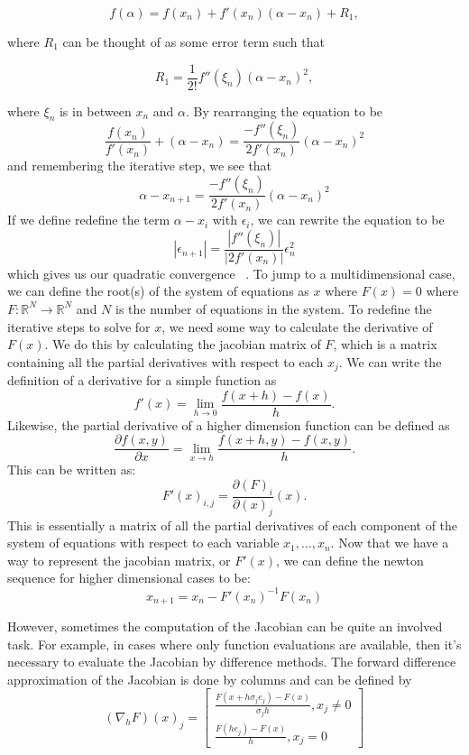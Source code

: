 \documentclass[paper=a4, fontsize=11pt]{scrartcl} %
\numberwithin{equation}{section} %
\numberwithin{figure}{section} %
\numberwithin{table}{section} %
\begin{document}
$$ f(\alpha) = f(x_n) + f'(x_n)(\alpha - x_n) + R_1, $$

where $R_1$ can be thought of as some error term such that 

$$ R_1 = \frac{1}{2!}f''(\xi_n)(\alpha - x_n)^2, $$

where $\xi_n$ is in between $x_n$ and $\alpha$.  
By rearranging the equation to be
$$ \frac{f(x_n)}{f'(x_n)} + (\alpha - x_n) = \frac{-f''(\xi_n)}{2f'(x_n)}(\alpha - x_n)^2 $$
and remembering the iterative step, we see that 
$$ \alpha - x_{n+1} = \frac{-f''(\xi_n)}{2f'(x_n)}(\alpha - x_n)^2$$
If we define redefine the term $\alpha - x_i$ with $\epsilon_i$, we can rewrite the equation to be
$$ |\epsilon_{n+1}| = \frac{|f''(\xi_n)|}{|2f'(x_n)|}\epsilon_n^2 $$
which gives us our quadratic convergence ~\cite{newton_kelley}.  
\bigskip
To jump to a multidimensional case, we can define the root(s) of the system of equations as $x$ where $F(x) = 0$ where $F:\mathbb{R}^N \rightarrow \mathbb{R}^N$ and $N$ is the number of equations in the system.  To redefine the iterative steps to solve for $x$, we need some way to calculate the derivative of $F(x)$.  We do this by calculating the jacobian matrix of $F$, which is a matrix containing all the partial derivatives with respect to each $x_j$.  We can write the definition of a derivative for a simple function as $$f'(x) = \lim_{h \to 0} \frac{f(x+h) - f(x)}{h}.$$  Likewise, the partial derivative of a higher dimension function can be defined as $$\frac{\partial f(x,y)}{\partial x} = \lim_{x \to h} \frac{f(x+h,y) - f(x,y)}{h}.$$
This can be written as:
$$ F'(x)_{i,j} = \frac{\partial(F)_i}{\partial(x)_j} (x). $$
This is essentially a matrix of all the partial derivatives of each component of the system of equations with respect to each variable $x_1 ,\hdots,x_n$.  Now that we have a way to represent the jacobian matrix, or $F'(x)$, we can define the newton sequence for higher dimensional cases to be:
$$ x_{n+1} = x_n - F'(x_n)^{-1} F(x_n) $$

However, sometimes the computation of the Jacobian can be quite an involved task.  For example, in cases where only function evaluations are available, then it's necessary to evaluate the Jacobian by difference methods.  The forward difference approximation of the Jacobian is done by columns and can be defined by 
$$
(\nabla_hF)(x)_j = \begin{bmatrix}
					\frac{F(x+h\sigma_je_j)-F(x)}{\sigma_jh}, x_j \neq 0 \\
                    \frac{F(he_j)-F(x)}{h}, x_j = 0	\end{bmatrix}
$$
\end{document}

